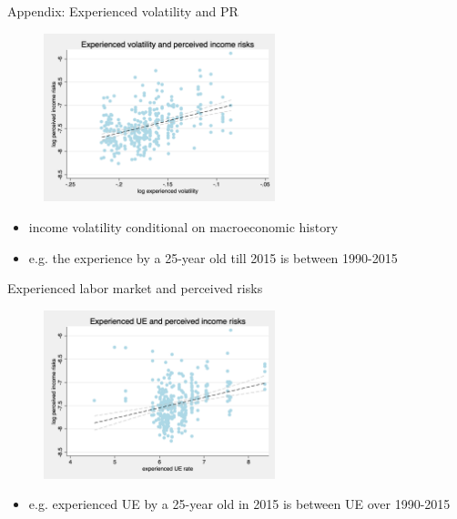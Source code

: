 \documentclass{beamer}
\begin{document}
\begin{frame}{Appendix: Experienced volatility and PR}
	\begin{figure}
		\centering 
		\label{experience_var_var_var}
		\includegraphics[width=0.6\textwidth]{figures/experience_var_var_data.png}
	\end{figure}
	\begin{itemize}
		\item income volatility conditional on macroeconomic history \cite{storesletten2004cyclical}
		\item e.g. the experience by a 25-year old till 2015 is between 1990-2015
	\end{itemize}
\end{frame}

\begin{frame}{Experienced labor market and perceived risks}
	\begin{figure}
		\centering 
		\label{experience_ue_var}
		\includegraphics[width=0.6\textwidth]{figures/experience_ue_var_data.png}
	\end{figure}
	\begin{itemize}
		\item e.g. experienced UE by a 25-year old in 2015 is between UE over 1990-2015
		
	\end{itemize}
\end{frame}
\end{document}
